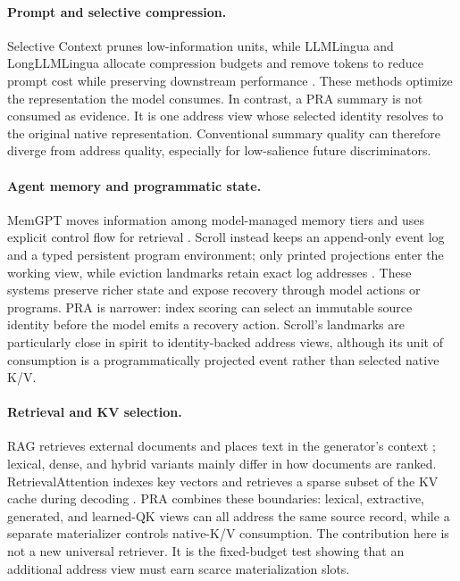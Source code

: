 \documentclass[11pt]{article}
\newcommand{\kv}{K/V\xspace}
\begin{document}
\paragraph{Prompt and selective compression.}
Selective Context prunes low-information units, while LLMLingua and
LongLLMLingua allocate compression budgets and remove tokens to reduce prompt
cost while preserving downstream performance
\cite{li2023selective,jiang2023llmlingua,jiang2023longllmlingua}. These methods
optimize the representation the model consumes. In contrast, a PRA summary is
not consumed as evidence. It is one address view whose selected identity
resolves to the original native representation. Conventional summary quality
can therefore diverge from address quality, especially for low-salience future
discriminators.

\paragraph{Agent memory and programmatic state.}
MemGPT moves information among model-managed memory tiers and uses explicit
control flow for retrieval \cite{packer2024memgpt}. Scroll instead keeps an
append-only event log and a typed persistent program environment; only printed
projections enter the working view, while eviction landmarks retain exact log
addresses \cite{lin2026scroll}. These systems preserve richer state and expose
recovery through model actions or programs. PRA is narrower: index scoring can
select an immutable source identity before the model emits a recovery action.
Scroll's landmarks are particularly close in spirit to identity-backed address
views, although its unit of consumption is a programmatically projected event
rather than selected native \kv.

\paragraph{Retrieval and KV selection.}
RAG retrieves external documents and places text in the generator's context
\cite{lewis2020rag}; lexical, dense, and hybrid variants mainly differ in how
documents are ranked. RetrievalAttention indexes key vectors and retrieves a
sparse subset of the KV cache during decoding \cite{liu2025retrievalattention}.
PRA combines these boundaries: lexical, extractive, generated, and learned-QK
views can all address the same source record, while a separate materializer
controls native-\kv consumption. The contribution here is not a new universal
retriever. It is the fixed-budget test showing that an additional address view
must earn scarce materialization slots.
\end{document}
